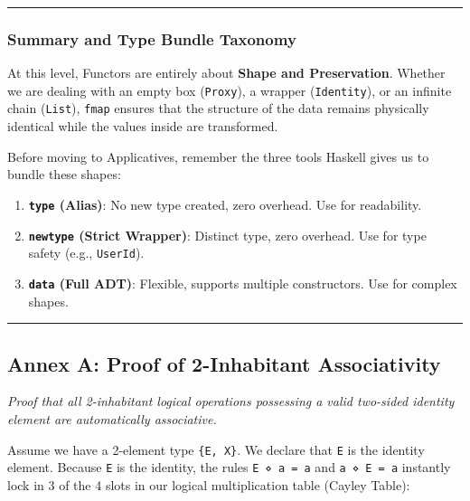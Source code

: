 \documentclass[
]{article}
\providecommand{\tightlist}{%
  \setlength{\itemsep}{0pt}\setlength{\parskip}{0pt}}
\begin{document}
\begin{center}\rule{0.5\linewidth}{0.5pt}\end{center}

\subsubsection{Summary and Type Bundle
Taxonomy}\label{summary-and-type-bundle-taxonomy}

At this level, Functors are entirely about \textbf{Shape and
Preservation}. Whether we are dealing with an empty box
(\texttt{Proxy}), a wrapper (\texttt{Identity}), or an infinite chain
(\texttt{List}), \texttt{fmap} ensures that the structure of the data
remains physically identical while the values inside are transformed.

Before moving to Applicatives, remember the three tools Haskell gives us
to bundle these shapes:

\begin{enumerate}
\def\labelenumi{\arabic{enumi}.}
\tightlist
\item
  \textbf{\texttt{type} (Alias)}: No new type created, zero overhead.
  Use for readability.
\item
  \textbf{\texttt{newtype} (Strict Wrapper)}: Distinct type, zero
  overhead. Use for type safety (e.g., \texttt{UserId}).
\item
  \textbf{\texttt{data} (Full ADT)}: Flexible, supports multiple
  constructors. Use for complex shapes.
\end{enumerate}

\begin{center}\rule{0.5\linewidth}{0.5pt}\end{center}

\subsection{Annex A: Proof of 2-Inhabitant
Associativity}\label{annex-a-proof-of-2-inhabitant-associativity}

\emph{Proof that all 2-inhabitant logical operations possessing a valid
two-sided identity element are automatically associative.}

Assume we have a 2-element type \texttt{\{E,\ X\}}. We declare that
\texttt{E} is the identity element. Because \texttt{E} is the identity,
the rules \texttt{E\ ⋄\ a\ =\ a} and \texttt{a\ ⋄\ E\ =\ a} instantly
lock in 3 of the 4 slots in our logical multiplication table (Cayley
Table):
\end{document}
